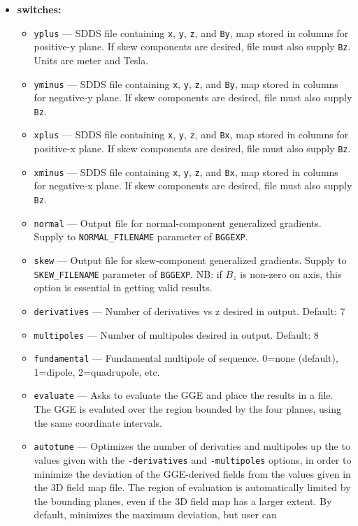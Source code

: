 \documentclass[11pt]{article}
\begin{document}
\begin{itemize}
\item {\bf switches:}
\begin{itemize}
\item {\tt yplus} --- SDDS file containing \verb|x|, \verb|y|, \verb|z|, and \verb|By|, 
  map stored in columns for positive-y plane. If skew components are desired, file must also supply \verb|Bz|.
  Units are meter and Tesla.
\item {\tt yminus} --- SDDS file containing \verb|x|, \verb|y|, \verb|z|, and \verb|By|, 
  map stored in columns for negative-y plane. If skew components are desired, file must also supply \verb|Bz|.
\item {\tt xplus} ---  SDDS file containing \verb|x|, \verb|y|, \verb|z|, and \verb|Bx|, 
  map stored in columns for positive-x plane. If skew components are desired, file must also supply \verb|Bz|.
\item {\tt xminus} ---  SDDS file containing \verb|x|, \verb|y|, \verb|z|, and \verb|Bx|, 
  map stored in columns for negative-x plane. If skew components are desired, file must also supply \verb|Bz|.
\item {\tt normal} ---  Output file for normal-component generalized gradients. Supply to \verb|NORMAL_FILENAME|
  parameter of \verb|BGGEXP|.
\item {\tt skew} ---  Output file for skew-component generalized gradients. Supply to \verb|SKEW_FILENAME|
  parameter of \verb|BGGEXP|. NB: if $B_z$ is non-zero on axis, this option is essential in getting
  valid results.
\item {\tt derivatives} --- Number of derivatives vs z desired in output. Default: 7
\item {\tt multipoles} ---  Number of multipoles desired in output. Default: 8
\item {\tt fundamental} --- Fundamental multipole of sequence. 0=none (default), 1=dipole, 2=quadrupole, etc.
\item {\tt evaluate} --- Asks to evaluate the GGE and place the results in a file. The GGE is evaluted over
  the region bounded by the four planes, using the same coordinate intervals.
\item {\tt autotune} --- Optimizes the number of derivaties and multipoles up the to values given with the
  \verb|-derivatives| and \verb|-multipoles| options, in order to minimize the deviation of the GGE-derived
  fields from the values given in the 3D field map file. The region of evaluation is automatically limited by
  the bounding planes, even if the 3D field map has a larger extent. By default, minimizes the maximum deviation, but user can

\end{itemize}
\end{itemize}
\end{document}

